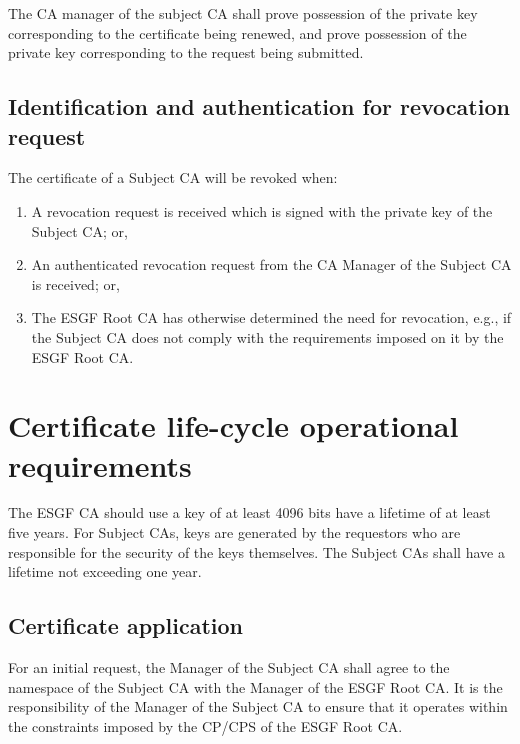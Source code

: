 The CA manager of the subject CA shall prove
possession of the private key corresponding to the certificate being
renewed, and prove possession of the private key corresponding to the
request being submitted.

\subsection{Identification and authentication for revocation request}\label{identification-and-authentication-for-revocation-request}

The certificate of a Subject CA will be revoked when:

\begin{enumerate}
\item
  
  A revocation request is received which is signed with the private key
  of the Subject CA; or,
  
\item
  
  An authenticated revocation request from the CA Manager of the Subject
  CA is received; or,
  
\item
  
  The ESGF Root CA has otherwise determined the need for revocation,
  e.g., if the Subject CA does not comply with the requirements imposed
  on it by the ESGF Root CA.
  
\end{enumerate}

\section{Certificate life-cycle operational requirements}\label{certificate-life-cycle-operational-requirements}

The ESGF CA should use a key of at least 4096 bits have a lifetime of at least five years. For Subject CAs, keys are generated by the requestors who are responsible for the security of the keys themselves. The Subject CAs shall have a lifetime not exceeding one year.

\subsection{Certificate application}\label{certificate-application}

For an initial request, the Manager of the Subject CA shall agree to the
namespace of the Subject CA with the Manager of the ESGF Root CA. It is
the responsibility of the Manager of the Subject CA to ensure that it
operates within the constraints imposed by the CP/CPS of the ESGF Root CA.

